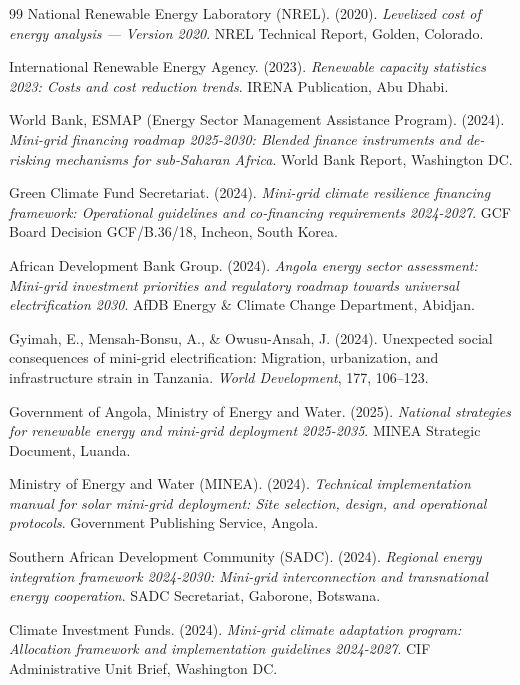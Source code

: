 \documentclass[12pt, a4paper]{article}
\begin{document}
\begin{thebibliography}{99}
 National Renewable Energy Laboratory (NREL). (2020). \textit{Levelized cost of energy analysis — Version 2020}. NREL Technical Report, Golden, Colorado.

 International Renewable Energy Agency. (2023). \textit{Renewable capacity statistics 2023: Costs and cost reduction trends}. IRENA Publication, Abu Dhabi.

 World Bank, ESMAP (Energy Sector Management Assistance Program). (2024). \textit{Mini-grid financing roadmap 2025-2030: Blended finance instruments and de-risking mechanisms for sub-Saharan Africa}. World Bank Report, Washington DC.

 Green Climate Fund Secretariat. (2024). \textit{Mini-grid climate resilience financing framework: Operational guidelines and co-financing requirements 2024-2027}. GCF Board Decision GCF/B.36/18, Incheon, South Korea.

 African Development Bank Group. (2024). \textit{Angola energy sector assessment: Mini-grid investment priorities and regulatory roadmap towards universal electrification 2030}. AfDB Energy \& Climate Change Department, Abidjan.

 Gyimah, E., Mensah-Bonsu, A., \& Owusu-Ansah, J. (2024). Unexpected social consequences of mini-grid electrification: Migration, urbanization, and infrastructure strain in Tanzania. \textit{World Development}, 177, 106--123.

 Government of Angola, Ministry of Energy and Water. (2025). \textit{National strategies for renewable energy and mini-grid deployment 2025-2035}. MINEA Strategic Document, Luanda.

 Ministry of Energy and Water (MINEA). (2024). \textit{Technical implementation manual for solar mini-grid deployment: Site selection, design, and operational protocols}. Government Publishing Service, Angola.

 Southern African Development Community (SADC). (2024). \textit{Regional energy integration framework 2024-2030: Mini-grid interconnection and transnational energy cooperation}. SADC Secretariat, Gaborone, Botswana.

 Climate Investment Funds. (2024). \textit{Mini-grid climate adaptation program: Allocation framework and implementation guidelines 2024-2027}. CIF Administrative Unit Brief, Washington DC.

\end{thebibliography}
\end{document}
